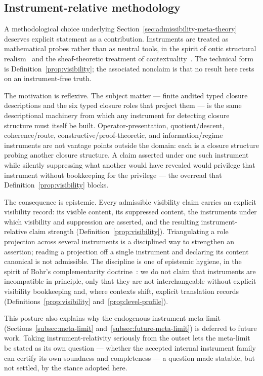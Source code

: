 \subsection{Instrument-relative methodology}\label{subsec:discussion-instrument-relative}

A methodological choice underlying
Section~\ref{sec:admissibility-meta-theory} deserves explicit
statement as a contribution. Instruments are treated as mathematical
probes rather than as neutral tools, in the spirit of ontic structural
realism~\citep{LadymanRoss2007} and the sheaf-theoretic treatment of
contextuality~\citep{AbramskyBrandenburger2011}. The technical form
is Definition~\ref{prop:visibility}; the associated nonclaim is that
no result here rests on an instrument-free truth.

The motivation is reflexive. The subject matter --- finite audited
typed closure descriptions and the six typed closure roles that
project them --- is the same descriptional machinery from which any
instrument for detecting closure structure must itself be built.
Operator-presentation, quotient/descent, coherence/route,
constructive/proof-theoretic, and information/regime instruments are
not vantage points outside the domain: each is a closure structure
probing another closure structure. A claim asserted under one such
instrument while silently suppressing what another would have
revealed would privilege that instrument without bookkeeping for the
privilege --- the overread that Definition~\ref{prop:visibility}
blocks.

The consequence is epistemic. Every admissible visibility claim carries an
explicit visibility record: its visible content, its suppressed
content, the instruments under which visibility and suppression are
asserted, and the resulting instrument-relative claim strength
(Definition~\ref{prop:visibility}). Triangulating a role projection
across several instruments is a disciplined way to strengthen an
assertion; reading a projection off a single instrument and declaring
its content canonical is not admissible. The discipline is one of
epistemic hygiene, in the spirit of Bohr's complementarity
doctrine~\citep{Bohr1958}: we do not claim that instruments are
incompatible in principle, only that they are not interchangeable
without explicit visibility bookkeeping and, where contexts shift,
explicit translation records
(Definitions~\ref{prop:visibility} and~\ref{prop:level-profile}).

This posture also explains why the endogenous-instrument meta-limit
(Sections~\ref{subsec:meta-limit} and~\ref{subsec:future-meta-limit})
is deferred to future work. Taking instrument-relativity seriously
from the outset lets the meta-limit be stated as its own question ---
whether the accepted internal instrument family can certify its own
soundness and completeness --- a question made statable, but not
settled, by the stance adopted here.


